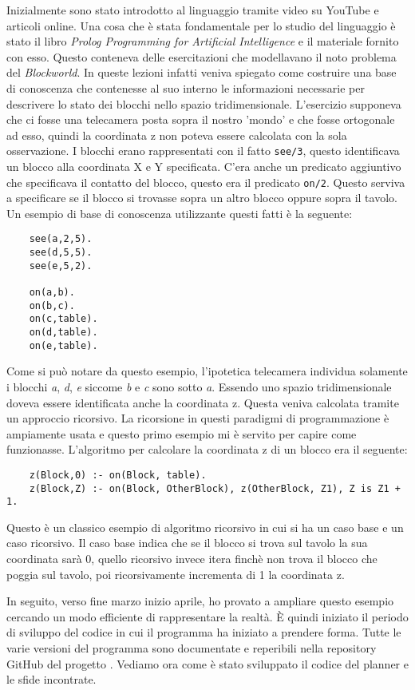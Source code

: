 Inizialmente sono stato introdotto al linguaggio tramite video su YouTube e articoli online. Una cosa che è stata fondamentale per
lo studio del linguaggio è stato il libro \textit{Prolog Programming for Artificial Intelligence} \cite{bratko2001prolog} e il materiale fornito con esso.
Questo conteneva delle esercitazioni che modellavano il noto problema del \textit{Blockworld}. In queste lezioni infatti veniva spiegato come costruire una base di conoscenza che contenesse al suo interno
le informazioni necessarie per descrivere lo stato dei blocchi nello spazio tridimensionale. L'esercizio supponeva che ci fosse una telecamera posta sopra il nostro 'mondo' e che fosse ortogonale ad esso, quindi la coordinata z non poteva essere calcolata con la sola osservazione.
I blocchi erano rappresentati con il fatto \verb+see/3+, questo identificava un blocco alla coordinata X e Y specificata.
C'era anche un predicato aggiuntivo che specificava il contatto del blocco, questo era il predicato \verb+on/2+. Questo serviva a specificare se il blocco si trovasse sopra un altro blocco oppure sopra il tavolo.
Un esempio di base di conoscenza utilizzante questi fatti è la seguente:
\begin{lstlisting}
    see(a,2,5).
    see(d,5,5).
    see(e,5,2).

    on(a,b).
    on(b,c).
    on(c,table).
    on(d,table).
    on(e,table).
\end{lstlisting}
Come si può notare da questo esempio, l'ipotetica telecamera individua solamente i blocchi \textit{a}, \textit{d}, \textit{e} siccome  \textit{b} e \textit{c} sono sotto \textit{a}.
Essendo uno spazio tridimensionale doveva essere identificata anche la coordinata z. Questa veniva calcolata tramite un approccio ricorsivo. La ricorsione in questi paradigmi di programmazione è ampiamente usata e questo primo esempio mi è servito per capire come funzionasse.
L'algoritmo per calcolare la coordinata z di un blocco era il seguente:
\begin{lstlisting}
    z(Block,0) :- on(Block, table).
    z(Block,Z) :- on(Block, OtherBlock), z(OtherBlock, Z1), Z is Z1 + 1.
\end{lstlisting}
Questo è un classico esempio di algoritmo ricorsivo in cui si ha un caso base e un caso ricorsivo. Il caso base indica che se il blocco si trova sul tavolo la sua coordinata sarà 0, quello ricorsivo invece itera finchè non trova il blocco che poggia sul tavolo, poi ricorsivamente incrementa di 1 la coordinata z.

In seguito, verso fine marzo inizio aprile, ho provato a ampliare questo esempio cercando un modo efficiente di rappresentare la realtà. È quindi iniziato il periodo di sviluppo del codice in cui il programma ha iniziato a prendere forma. Tutte le varie versioni del programma sono documentate e reperibili nella repository GitHub del progetto \cite{gitrepo}.
Vediamo ora come è stato sviluppato il codice del planner e le sfide incontrate.

